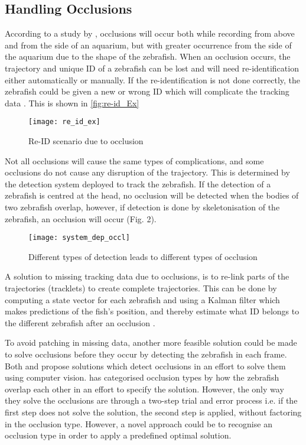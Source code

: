 \subsection{Handling Occlusions}
According to a study by \cite{Qian2017}, occlusions will occur both while recording from above and from the side of an aquarium, but with greater occurrence from the side of the aquarium due to the shape of the zebrafish. When an occlusion occurs, the trajectory and unique ID of a zebrafish can be lost and will need re-identification either automatically or manually. If the re-identification is not done correctly, the zebrafish could be given a new or wrong ID which will complicate the tracking data \citep{Feijo2018}. This is shown in \autoref{fig:re-id_Ex}

\begin{figure}[H]
	\centering
	\texttt{[image: re\_id\_ex]}
	\caption{Re-ID scenario due to occlusion}
	\label{fig:re-id_Ex}
\end{figure}

Not all occlusions will cause the same types of complications, and some occlusions do not cause any disruption of the trajectory. This is determined by the detection system deployed to track the zebrafish. If the detection of a zebrafish is centred at the head, no occlusion will be detected when the bodies of two zebrafish overlap, however, if detection is done by skeletonisation of the zebrafish, an occlusion will occur (Fig. 2).\\

\begin{figure}[H]
	\centering
	\texttt{[image: system\_dep\_occl]}
	\caption{Different types of detection leads to different types of occlusion}
	\label{fig:system_dep_occl}
\end{figure}

A solution to missing tracking data due to occlusions, is to re-link parts of the trajectories (tracklets) to create complete trajectories. This can be done by computing a state vector for each zebrafish and using a Kalman filter which makes predictions of the fish’s position, and thereby estimate what ID belongs to the different zebrafish after an occlusion \citep{Feijo2018, Qian2014}.



To avoid patching in missing data, another more feasible solution could be made to solve occlusions before they occur by detecting the zebrafish in each frame. Both \cite{Romero-Ferrero2019} and \cite{Dolado2014} propose solutions which detect occlusions in an effort to solve them using computer vision. \cite{Dolado2014} has categorised occlusion types by how the zebrafish overlap each other in an effort to specify the solution. However, the only way they solve the occlusions are through a two-step trial and error process i.e. if the first step does not solve the solution, the second step is applied, without factoring in the occlusion type. 
However, a novel approach could be to recognise an occlusion type in order to apply a predefined optimal solution.


